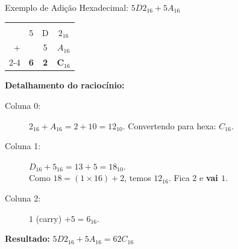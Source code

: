 \begin{frame}{Exemplo de Adição Hexadecimal: $5D2_{16} + 5A_{16}$}
    \centering
    \begin{tabular}{r ccc}
        \color{blue}{\footnotesize (carry)} & \color{blue}{1} &            &                   \\
                                            & 5               & D          & $2_{16}$          \\
        +                                   &                 & 5          & $A_{16}$          \\ \cline{2-4}
                                            & \textbf{6}      & \textbf{2} & \textbf{C$_{16}$} \\
    \end{tabular}

    \vspace{0.4cm}
    \flushleft
    \textbf{Detalhamento do raciocínio:}
    \begin{description}
        \item[Coluna 0:] $2_{16} + A_{16} = 2 + 10 = 12_{10}$. Convertendo para hexa: \textbf{$C_{16}$}.
        \item[Coluna 1:] $D_{16} + 5_{16} = 13 + 5 = 18_{10}$. \\
              Como $18 = (1 \times 16) + 2$, temos \textbf{$12_{16}$}. Fica $2$ e \textbf{vai $1$}.
        \item[Coluna 2:] $1$ (carry) $+ 5 = 6_{16}$.
    \end{description}

    \vspace{0.4cm}
    \textbf{Resultado:} $5D2_{16} + 5A_{16} = 62C_{16}$
\end{frame}

